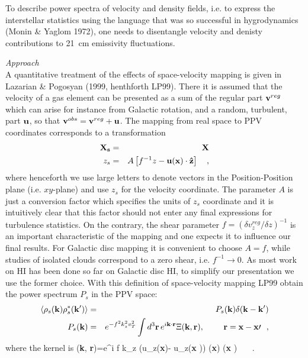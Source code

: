 To describe power spectra of velocity and density fields, i.e. to
express the interstellar statistics using the language that was so
successful in hygrodynamics (Monin \& Yaglom 1972), one needs
to disentangle velocity and denisty contributions to 21~cm emissivity
fluctuations. 

  
{\em Approach}\\
A quantitative 
treatment of the effects of space-velocity mapping is given in Lazarian
\& Pogosyan (1999, henthforth LP99). There it is assumed that the 
velocity of a gas
element can be presented as a sum of the regular part ${\bf v}^{reg}$
which can arise for instance from 
Galactic rotation, and a random, turbulent,
part ${\bf u}$, so that
${\bf v}^{obs} = {\bf v}^{reg} + {\bf u}$. 
The mapping from real space to PPV coordinates corresponds to
a transformation
\begin{eqnarray}
{\bf X_s} &=& {\bf X} \nonumber  \\ 
z_s &=& A \left[ f^{-1} z - {\bf u}({\bf x}) \cdot {\bf \hat z} \right]~~~, 
\label{eq:mapnoz}
\end{eqnarray}
 where henceforth we use large letters to denote vectors in the
Position-Position plane (i.e. $xy$-plane)
and use $z_s$ for  the velocity coordinate. The parameter 
$A$ is just a conversion factor which specifies the units
of $z_s$ coordinate and it is intuitively clear that this factor should
not enter any final expressions for turbulence statistics. On the contrary,
the shear parameter $f=\left(\delta v_z^{reg} / \delta z \right)^{-1}$
is an important characteristic of the mapping and one expects it
to influence our final results. For Galactic disc mapping it is convenient to choose
$A=f$, while studies of isolated clouds correspond to a zero shear,
i.e. $ f^{-1} \to 0$. As most work on HI has been done so far on Galactic
disc HI, to simplify our presentation we use the former choice. With this
definition of space-velocity mapping LP99 obtain the power spectrum
$P_s$ in the PPV space:
\begin{eqnarray}
\langle \rho_s({\bf k}) \rho_s^{*}({\bf k^{\prime}}) \rangle &=& P_s({\bf k}) 
\delta({\bf k - k^{\prime}})\nonumber \\
P_s({\bf k}) &=& e^{-f^2
k_z^2 v_T^2}
\int d^3 {\bf r} \, e^{i {\bf k}  \cdot {\bf r}} 
\Xi({\bf k}, {\bf r}),
~~~~~~~ {\bf r}={\bf x} - {\bf x \prime}~~,
\label{eq:roman}
\end{eqnarray}
where the kernel is
\be
\Xi({\bf k}, {\bf r})=\langle e^{i f 
k_z (u_z({\bf x})- u_z({\bf x \prime}))}
\rho ({\bf x}) \rho ({\bf x \prime}) \rangle~~~.
